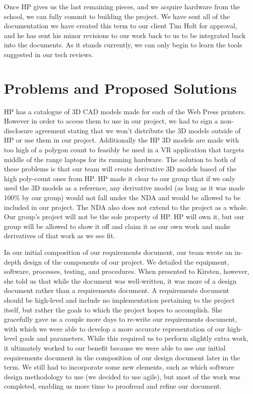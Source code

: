 \documentclass[onecolumn, draftclsnofoot,10pt, compsoc]{IEEEtran}
\begin{document}
Once HP gives us the last remaining pieces, and we acquire hardware from the school, we can fully commit to building the project. We have sent all of the documentation we have created this term to our client Tim Holt for approval, and he has sent his minor revisions to our work back to us to be integrated back into the documents. As it stands currently, we can only begin to learn the tools suggested in our tech reviews.

\section{Problems and Proposed Solutions}

HP has a catalogue of 3D CAD models made for each of the Web Press printers. However in order to access them to use in our project, we had to sign a non-disclosure agreement stating that we won't distribute the 3D models outside of HP or use them in our project. Additionally the HP 3D models are made with too high of a polygon count to feasibly be used in a VR application that targets middle of the range laptops for its running hardware. The solution to both of these problems is that our team will create derivative 3D models based of the high poly-count ones from HP. HP made it clear to our group that if we only used the 3D models as a reference, any derivative model (as long as it was made 100\% by our group) would not fall under the NDA and would be allowed to be included in our project. The NDA also does not extend to the project as a whole. Our group's project will not be the sole property of HP. HP will own it, but our group will be allowed to show it off and claim it as our own work and make derivatives of that work as we see fit.

In our initial composition of our requirements document, our team wrote an in-depth design of the components of our project. We detailed the equipment, software, processes, testing, and procedures. When presented to Kirsten, however, she told us that while the document was well-written, it was more of a design document rather than a requirements document. A requirements document should be high-level and include no implementation pertaining to the project itself, but rather the goals to which the project hopes to accomplish. She gracefully gave us a couple more days to re-write our requirements document, with which we were able to develop a more accurate representation of our high-level goals and parameters. While this required us to perform slightly extra work, it ultimately worked to our benefit because we were able to use our initial requirements document in the composition of our design document later in the term. We still had to incorporate some new elements, such as which software design methodology to use (we decided to use agile), but most of the work was completed, enabling us more time to proofread and refine our document.
\end{document}
